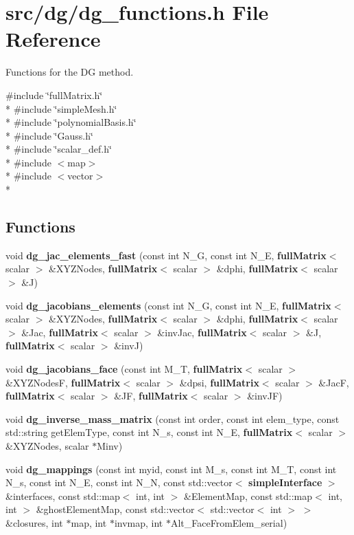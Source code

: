 \section{src/dg/dg\-\_\-functions.h File Reference}
\label{dg__functions_8h}


Functions for the D\-G method.  


{\ttfamily \#include \char`\"{}full\-Matrix.\-h\char`\"{}}\\*
{\ttfamily \#include \char`\"{}simple\-Mesh.\-h\char`\"{}}\\*
{\ttfamily \#include \char`\"{}polynomial\-Basis.\-h\char`\"{}}\\*
{\ttfamily \#include \char`\"{}Gauss.\-h\char`\"{}}\\*
{\ttfamily \#include \char`\"{}scalar\-\_\-def.\-h\char`\"{}}\\*
{\ttfamily \#include $<$map$>$}\\*
{\ttfamily \#include $<$vector$>$}\\*
\subsection*{Functions}
\begin{DoxyCompactItemize}
\item 
void {\bf dg\-\_\-jac\-\_\-elements\-\_\-fast} (const int N\-\_\-\-G, const int N\-\_\-\-E, {\bf full\-Matrix}$<$ scalar $>$ \&X\-Y\-Z\-Nodes, {\bf full\-Matrix}$<$ scalar $>$ \&dphi, {\bf full\-Matrix}$<$ scalar $>$ \&J)
\item 
void {\bf dg\-\_\-jacobians\-\_\-elements} (const int N\-\_\-\-G, const int N\-\_\-\-E, {\bf full\-Matrix}$<$ scalar $>$ \&X\-Y\-Z\-Nodes, {\bf full\-Matrix}$<$ scalar $>$ \&dphi, {\bf full\-Matrix}$<$ scalar $>$ \&Jac, {\bf full\-Matrix}$<$ scalar $>$ \&inv\-Jac, {\bf full\-Matrix}$<$ scalar $>$ \&J, {\bf full\-Matrix}$<$ scalar $>$ \&inv\-J)
\item 
void {\bf dg\-\_\-jacobians\-\_\-face} (const int M\-\_\-\-T, {\bf full\-Matrix}$<$ scalar $>$ \&X\-Y\-Z\-Nodes\-F, {\bf full\-Matrix}$<$ scalar $>$ \&dpsi, {\bf full\-Matrix}$<$ scalar $>$ \&Jac\-F, {\bf full\-Matrix}$<$ scalar $>$ \&J\-F, {\bf full\-Matrix}$<$ scalar $>$ \&inv\-J\-F)
\item 
void {\bf dg\-\_\-inverse\-\_\-mass\-\_\-matrix} (const int order, const int elem\-\_\-type, const std\-::string get\-Elem\-Type, const int N\-\_\-s, const int N\-\_\-\-E, {\bf full\-Matrix}$<$ scalar $>$ \&X\-Y\-Z\-Nodes, scalar $\ast$Minv)
\item 
void {\bf dg\-\_\-mappings} (const int myid, const int M\-\_\-s, const int M\-\_\-\-T, const int N\-\_\-s, const int N\-\_\-\-E, const int N\-\_\-\-N, const std\-::vector$<$ {\bf simple\-Interface} $>$ \&interfaces, const std\-::map$<$ int, int $>$ \&Element\-Map, const std\-::map$<$ int, int $>$ \&ghost\-Element\-Map, const std\-::vector$<$ std\-::vector$<$ int $>$ $>$ \&closures, int $\ast$map, int $\ast$invmap, int $\ast$Alt\-\_\-\-Face\-From\-Elem\-\_\-serial)
\end{DoxyCompactItemize}


